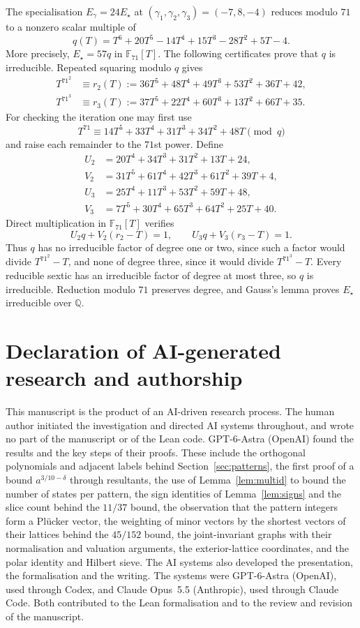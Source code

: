 \documentclass[11pt]{article}
\theoremstyle{definition}
\theoremstyle{remark}
\begin{document}
The specialisation $E_\gamma=24E_\star$ at
$(\gamma_1,\gamma_2,\gamma_3)=(-7,8,-4)$ reduces modulo $71$ to a nonzero
scalar multiple of
\[
 q(T)=T^6+20T^5-14T^4+15T^3-28T^2+5T-4.
\]
More precisely, $E_\star=57q$ in $\mathbb F_{71}[T]$.
The following certificates prove that $q$ is irreducible. Repeated squaring
modulo $q$ gives
\begin{align*}
 T^{71^2}&\equiv r_2(T):=36T^5+48T^4+49T^3+53T^2+36T+42,\\
 T^{71^3}&\equiv r_3(T):=37T^5+22T^4+60T^3+13T^2+66T+35.
\end{align*}
For checking the iteration one may first use
\[
 T^{71}\equiv14T^5+33T^4+31T^3+34T^2+48T\pmod q
\]
and raise each remainder to the $71$st power. Define
\begin{align*}
 U_2&=20T^4+34T^3+31T^2+13T+24,\\
 V_2&=31T^5+61T^4+42T^3+61T^2+39T+4,\\
 U_3&=25T^4+11T^3+53T^2+59T+48,\\
 V_3&=7T^5+30T^4+65T^3+64T^2+25T+40.
\end{align*}
Direct multiplication in $\mathbb F_{71}[T]$ verifies
\[
 U_2q+V_2(r_2-T)=1,\qquad U_3q+V_3(r_3-T)=1.
\]
Thus $q$ has no irreducible factor of degree one or two, since such a factor
would divide $T^{71^2}-T$, and none of degree three, since it would divide
$T^{71^3}-T$. Every reducible sextic has an irreducible factor of degree at
most three, so $q$ is irreducible. Reduction modulo $71$ preserves degree,
and Gauss's lemma proves $E_\star$ irreducible over $\mathbb Q$.

\section*{Declaration of AI-generated research and authorship}
This manuscript is the product of an AI-driven research process. The human
author initiated the investigation and directed AI systems throughout, and
wrote no part of the manuscript or of the Lean code. GPT-6-Astra (OpenAI) found
the results and the key steps of their proofs. These include the orthogonal
polynomials and adjacent labels behind Section~\ref{sec:patterns}, the first
proof of a bound $a^{3/10-\delta}$ through resultants, the use of
Lemma~\ref{lem:multid} to bound the number of states per pattern, the sign
identities of Lemma~\ref{lem:signs} and the slice count behind the $11/37$
bound, the observation that the pattern integers form a Pl\"ucker vector, the
weighting of minor vectors by the shortest vectors of their lattices behind
the $45/152$ bound, the joint-invariant graphs with their normalisation and
valuation arguments, the exterior-lattice coordinates, and the polar identity
and Hilbert sieve. The AI systems also developed the presentation, the
formalisation and the writing. The systems were GPT-6-Astra (OpenAI), used
through Codex, and Claude Opus~5.5 (Anthropic), used through Claude Code. Both
contributed to the Lean formalisation and to the review and revision of the
manuscript.
\end{document}
